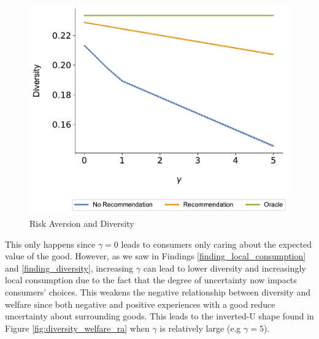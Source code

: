 \documentclass[sigconf]{acmart}
\begin{document}
\begin{figure}
\includegraphics[scale=0.1]{figures/gamma_diversity_N_200_T_20}
\caption{Risk Aversion and Diversity}
\label{fig:risk_aversion_diversity}
\end{figure}

This only happens since $\gamma = 0$ leads to consumers only caring about the expected value of the good. However, as we saw in Findings \ref{finding_local_consumption} and \ref{finding_diversity}, increasing $\gamma$ can lead to lower diversity and increasingly local consumption due to the fact that the degree of uncertainty now impacts consumers' choices. This weakens the negative relationship between diversity and welfare since both negative and positive experiences with a good reduce uncertainty about surrounding goods. This leads to the inverted-U shape found in Figure \ref{fig:diversity_welfare_ra} when $\gamma$ is relatively large (e.g $\gamma = 5$).
\end{document}
